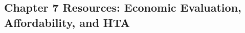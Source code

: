 \begin{refsection}
\chapter{Chapter 7 Resources: Economic Evaluation, Affordability, and HTA}
\label{chap:comp-ch07}



\printbibliography[heading=subbibliography,title={Chapter 7 References}]
\end{refsection}
